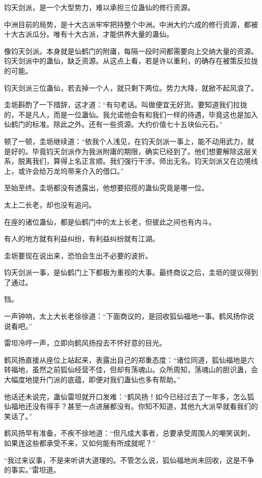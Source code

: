 \begin{this_body}
钧天剑派，是一个大型势力，难以承担三位蛊仙的修行资源。

中洲目前的局势，是十大古派牢牢把持整个中洲。中洲大约六成的修行资源，都被十大古派瓜分。唯有十大古派，才能供养大量的蛊仙。

像钧天剑派。本身就是仙鹤门的附庸，每隔一段时间都需要向上交纳大量的资源。钧天剑派中的蛊仙，缺乏资源。从这点上看，若是许以重利，的确存在被策反拉拢的可能。

钧天剑派三位蛊仙，若去掉一个人，就只剩下两位。势力大降，就掀不起风浪了。

圭坜斟酌了一下措辞，这才道：“有句老话。叫做便宜无好货。要知道我们拉拢的，不是凡人，而是一位蛊仙。我允诺他会有和我们一样的待遇，毕竟这也是加入仙鹤门的标准。除此之外。还有一些资源。大约价值七十五块仙元石。”

顿了一顿，圭坜继续道：“依我个人浅见，在钧天剑派一事上，能不动用武力，就是好的。毕竟钧天剑派作为我派附庸的期限，确实已经到了。他们想要解除这层关系，脱离我们，算得上名正言顺。我们强行干涉。师出无名。钧天剑派又在边境线上，或许会给万龙坞带来介入的借口。”

至始至终。圭坜都没有透露出，他想要招揽的蛊仙究竟是哪一位。

太上二长老，却也没有追问。

在座的诸位蛊仙，都是仙鹤门中的太上长老，但彼此之间也有内斗。

有人的地方就有利益纠纷，有利益纠纷就有江湖。

圭坜要现在说出来，恐怕会生出不必要的波折。

钧天剑派一事，是仙鹤门上下都极为重视的大事。最终商议之后，圭坜的提议得到了通过。

铛。

一声钟响，太上大长老徐徐道：“下面商议的，是回收狐仙福地一事。鹤风扬你说说看吧。”

雷坦冷哼一声，立即向鹤风扬投去不怀好意的目光。

鹤风扬直接从座位上站起来，表露出自己的郑重态度：“诸位同道，狐仙福地是六转福地，虽然之前狐仙经营不佳，但却有荡魂山。众所周知，荡魂山的胆识蛊，会大幅度地提升门派的底蕴，即便对我们蛊仙也多有帮助。”

他话还未说完，蛊仙雷坦就开口发难：“鹤风扬！如今已经过去了一年多，怎么狐仙福地还没有得手？甚至一点进展都没有。你知不知道，其他九大派早就看我们的笑话了。”

鹤风扬早有准备，不疾不徐地道：“但凡成大事者，总要承受周围人的嘲笑讽刺，如果连这些都承受不来，又如何能有所成就呢？”

“我过来议事，不是来听讲大道理的。不管怎么说，狐仙福地尚未回收，这是不争的事实。”雷坦道。


\end{this_body}
